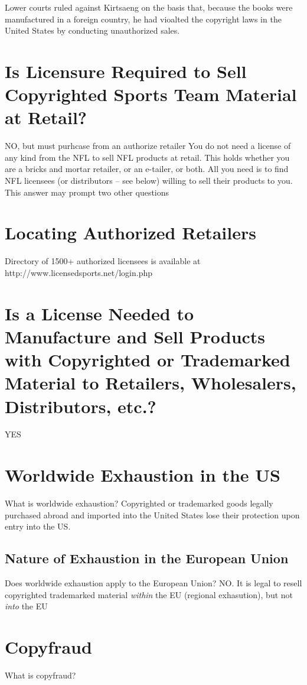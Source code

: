 \documentclass[letterpaper,11pt]{texMemo}
\begin{document}
  Lower courts ruled against Kirtsaeng on the basis that, because the books were manufactured in a foreign country, he had vioalted the copyright laws in the United States by conducting unauthorized sales.


\section*{Is Licensure Required to Sell Copyrighted Sports Team Material at Retail?}
	NO, but must purhcase from an authorize retailer
		You do not need a license of any kind from the NFL to sell NFL products at retail. This holds whether you are a bricks and mortar retailer, or an e-tailer, or both. All you need is to find NFL licensees (or distributors – see below) willing to sell their products to you. This answer may prompt two other questions
\section*{Locating Authorized Retailers}
	Directory of 1500+ authorized licensees is available at http://www.licensedsports.net/login.php
\section*{Is a License Needed to Manufacture and Sell Products with Copyrighted or Trademarked Material to Retailers, Wholesalers, Distributors, etc.?}
  YES
\section*{Worldwide Exhaustion in the US}
What is worldwide exhaustion?
	Copyrighted or trademarked goods legally purchased abroad and imported into the United States lose their protection upon entry into the US.
  \subsection*{Nature of Exhaustion in the European Union}
  Does worldwide exhaustion apply to the European Union?
	NO. It is legal to resell copyrighted trademarked material \emph{within} the EU (regional exhasution), but not \emph{into} the EU
\section*{Copyfraud}
  What is copyfraud?


\end{document}

